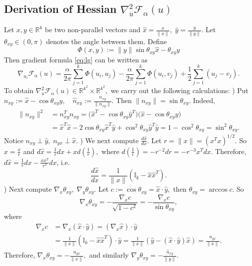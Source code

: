 \documentclass{amsart}%
\begin{document}
\subsection{Derivation of Hessian \texorpdfstring{$\nabla^2_{u}\mathcal F_{\alpha}(u)$}{Hessian}}\label{app:hessian}
Let $x,y\in \mathbb R^k$ be two non-parallel vectors and $\hat{x}=\frac{x}{\|x\|},\; \hat{y}=\frac{y}{\|y\|}$. Let $\theta_{xy}\in (0,\pi)$ denotes the angle between them. Define
\begin{equation}\label{eq: Phi}
\Phi(x,y):=\|y\|\sin\theta_{xy}\hat{x}-\theta_{xy}y
\end{equation}
Then gradient formula \eqref{eq:lg} can be written as
\[
\nabla_{u_i}\mathcal F_{\alpha}(u)=\frac{\alpha}{2\pi}\sum_{j=1}^{k}\Phi(u_i,u_j)
-\frac{\alpha}{2\pi}\sum_{j=1}^{k}\Phi(u_i,v_j)+\frac{1}{2}\sum_{j=1}^{k}(u_j-v_j).
\]
To obtain $\nabla^2_u\mathcal F_{\alpha}(u)\in\mathbb R^{k^2}\times \mathbb R^{k^2},$ we carry out the following calculations:\vskip 0.3cm
)
Put $n_{xy}:=\hat{x}-\cos\theta_{xy}\hat{y},\quad \hat{n}_{xy}:=\frac{n_{xy}}{\|n_{xy}\|}.$
Then $\|n_{xy}\|=\sin\theta_{xy}.$ Indeed, 
\begin{align*}
\|n_{xy}\|^2&=n_{xy}^Tn_{xy}=\Big(\hat{x}^T-\cos\theta_{xy}\hat{y}^T\Big)\Big(\hat{x}-\cos\theta_{xy}\hat{y}\Big)\\
&=\hat{x}^T\hat{x}-2\cos\theta_{xy}\hat{x}^T\hat{y}+\cos^2\theta_{xy}\hat{y}^T\hat{y}=1-\cos^2\theta_{xy}=\sin^2\theta_{xy}.
\end{align*}
Notice $n_{xy}\perp \hat{y},\; n_{yx}\perp \hat{x}.$\vskip 0.3cm
) We next compute $\frac{d\hat{x}}{dx}.$ Let $r=\|x\|=(x^Tx)^{1/2}.$ So $\hat{x}=\frac{x}{r}$ and $d\hat{x}=\frac{1}{r}dx+xd(\frac{1}{r}),$
where $d(\frac{1}{r})=-r^{-2}dr=-r^{-3}x^Tdx.$ Therefore, $d\hat{x}=\frac{1}{r}dx-\frac{xx^T}{r^3}dx$, i.e.
\[
\frac{d\hat{x}}{dx}=\frac{1}{\|x\|}(\mathbb I_k-\hat{x}\hat{x}^T).
\]
) Next compute $\nabla_x\theta_{xy},\; \nabla_y\theta_{xy}.$ Let $c:=\cos\theta_{xy}=\hat{x}\cdot\hat{y},$ then $\theta_{xy}=\arccos c.$ So
\[
\nabla_x\theta_{xy}=-\frac{\nabla_x c}{\sqrt{1-c^2}}=-\frac{\nabla_x c}{\sin\theta_{xy}},
\]
where
\begin{align*}
\nabla_x c&=\nabla_x(\hat{x}\cdot \hat{y})=(\nabla_x\hat{x})\cdot \hat{y}\\
&=\frac{1}{\|x\|}(\mathbb I_k-\hat{x}\hat{x}^T)\cdot \hat{y}=\frac{1}{\|x\|}(\hat{y}-(\hat{x}\cdot \hat{y})\hat{x})=\frac{n_{yx}}{\|x\|}.
\end{align*}
Therefore, $\nabla_x\theta_{xy}=-\frac{\hat{n}_{yx}}{\|x\|},$ and similarly $\nabla_y\theta_{xy}=-\frac{\hat{n}_{xy}}{\|y\|}.$ \vskip 0.3cm
\end{document}
